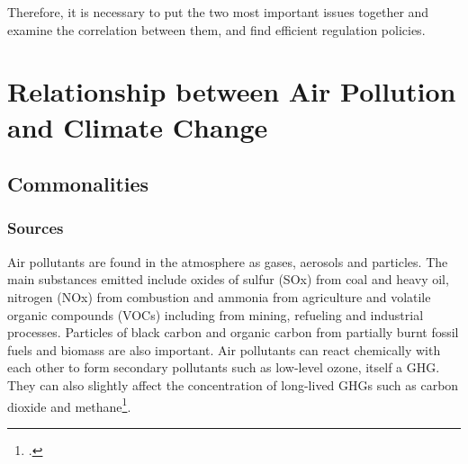 \documentclass[]{article}
\begin{document}
Therefore, it is necessary to put the two most important issues together and examine the correlation between them, and find efficient regulation policies.










\section{Relationship between Air Pollution and Climate Change}
\subsection{Commonalities}
\subsubsection{Sources}

Air pollutants are found in the atmosphere as gases, aerosols and particles. 
The main substances emitted include oxides of sulfur (SOx) from coal and heavy oil, nitrogen (NOx) from combustion and ammonia from agriculture and volatile organic compounds (VOCs) including from mining, refueling and industrial processes. Particles of black carbon and organic carbon from partially burnt fossil fuels and biomass are also important. Air pollutants can react chemically with each other to form secondary pollutants such as low-level ozone, itself a GHG. They can also slightly affect the concentration of long-lived GHGs such as carbon dioxide and methane\footcite{Warrilow2021}.
\end{document}
